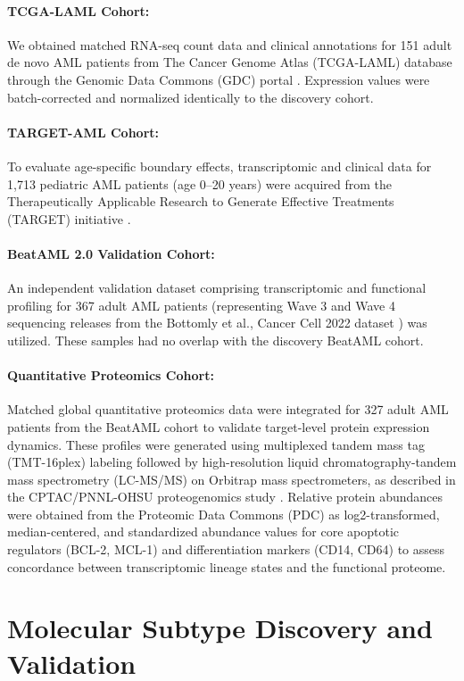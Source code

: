 \documentclass[11pt,a4paper]{article}
\begin{document}
\paragraph{TCGA-LAML Cohort:} We obtained matched RNA-seq count data and clinical annotations for 151 adult de novo AML patients from The Cancer Genome Atlas (TCGA-LAML) database through the Genomic Data Commons (GDC) portal \cite{cancer2013tcga}. Expression values were batch-corrected and normalized identically to the discovery cohort.
\paragraph{TARGET-AML Cohort:} To evaluate age-specific boundary effects, transcriptomic and clinical data for 1,713 pediatric AML patients (age 0--20 years) were acquired from the Therapeutically Applicable Research to Generate Effective Treatments (TARGET) initiative \cite{bolouri2018target}.
\paragraph{BeatAML 2.0 Validation Cohort:} An independent validation dataset comprising transcriptomic and functional profiling for 367 adult AML patients (representing Wave 3 and Wave 4 sequencing releases from the Bottomly et al., Cancer Cell 2022 dataset \cite{bottomly2022}) was utilized. These samples had no overlap with the discovery BeatAML cohort.
\paragraph{Quantitative Proteomics Cohort:} Matched global quantitative proteomics data were integrated for 327 adult AML patients from the BeatAML cohort to validate target-level protein expression dynamics. These profiles were generated using multiplexed tandem mass tag (TMT-16plex) labeling followed by high-resolution liquid chromatography-tandem mass spectrometry (LC-MS/MS) on Orbitrap mass spectrometers, as described in the CPTAC/PNNL-OHSU proteogenomics study \cite{pino2024mapping}. Relative protein abundances were obtained from the Proteomic Data Commons (PDC) as log2-transformed, median-centered, and standardized abundance values for core apoptotic regulators (BCL-2, MCL-1) and differentiation markers (CD14, CD64) to assess concordance between transcriptomic lineage states and the functional proteome.

\section{Molecular Subtype Discovery and Validation}
\end{document}
